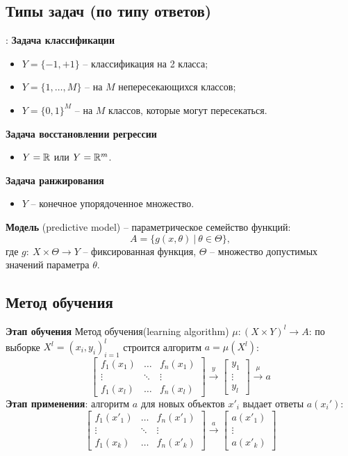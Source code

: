 \begin{multicols}{2}
    \subsection*{Типы задач (по типу ответов)}:
    \textbf{Задача классификации}
    \begin{itemize}
      \item $Y = \{-1, +1\}$ -- классификация на 2 класса;
      \item $Y = \{1, \ldots, M\}$ -- на $M$ непересекающихся классов;
      \item $Y = \{0,1 \}^M$ -- на $M$ классов, которые могут пересекаться.
    \end{itemize}
    \textbf{Задача восстановлении регрессии}
    \begin{itemize}
      \item $Y = \mathbb{R}$ или $Y = \mathbb{R}^m$.
    \end{itemize}
    \textbf{Задача ранжирования}
    \begin{itemize}
      \item $Y$ -- конечное упорядоченное множество.
    \end{itemize}
    \textbf{Модель} (predictive model) -- параметрическое семейство функций:
    \[
        A = \{g(x, \theta) \ \big| \ \theta \in \Theta\},
    \]
    где $g: \ X \times \Theta \to Y$ -- фиксированная функция, $\Theta$ -- множество допустимых значений параметра $\theta$.
    \bigskip \par
    \subsection*{Метод обучения}
    \textbf{Этап обучения} Метод обучения(learning algorithm) $\mu: (X\times Y)^l \to A$: по выборке $X^l = (x_i, y_i)_{i=1}^l$ строится алгоритм $a = \mu(X^l)$:
    \[
        \begin{bmatrix}
          f_1(x_1) & \ldots & f_n(x_1)\\
          \vdots & \ddots & \vdots\\
          f_1(x_l) & \ldots & f_n(x_l)
        \end{bmatrix} \overset{y}{\to} \begin{bmatrix}
          y_1 \\
          \vdots\\
          y_l
        \end{bmatrix} \overset{\mu}{\to} a
    \] 
    \textbf{Этап применения}: алгоритм $a$ для новых объектов $x'_i$ выдает ответы $a(x_i')$:
    \[
        \begin{bmatrix}
          f_1(x'_1) & \ldots & f_n(x'_1)\\
          \vdots & \ddots & \vdots\\
          f_1(x_k) & \ldots & f_n(x'_k)
        \end{bmatrix} \overset{a}{\to} \begin{bmatrix}
          a(x'_1)\\
          \vdots\\
          a(x'_k)
        \end{bmatrix}
    \]

\end{multicols}
